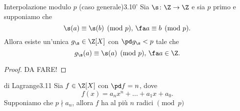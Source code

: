 \begin{prop}{Interpolazione modulo \(p\) (caso generale)}{3.10'}
	Sia \(\s\colon \Z \to \Z\) e sia \(p\) primo e supponiamo che
	\[
		\s(a) \equiv \s(b) \pmod{p},\,\fa a \equiv b \pmod{p}.
	\]
	Allora esiste un'unica \(g_\s\in\Z[X]\) con \(\pd g_\s < p\) tale che
	\[
		g_\s(a) \equiv \s(a) \pmod{p},\,\fa a \in \Z.
	\]
\end{prop}

\begin{proof}
	DA FARE!%
\end{proof}

\begin{teor}{di Lagrange}{3.11}
	Sia \(f\in\Z[X]\) con \(\pd f = n\), dove
	\[
		f(x) = a_n x^n + \ldots + a_1 x + a_0.
	\]
	Supponiamo che \(p\nmid a_n\), allora \(f\) ha al più \(n\) radici \(\pmod{p}\)
\end{teor}

